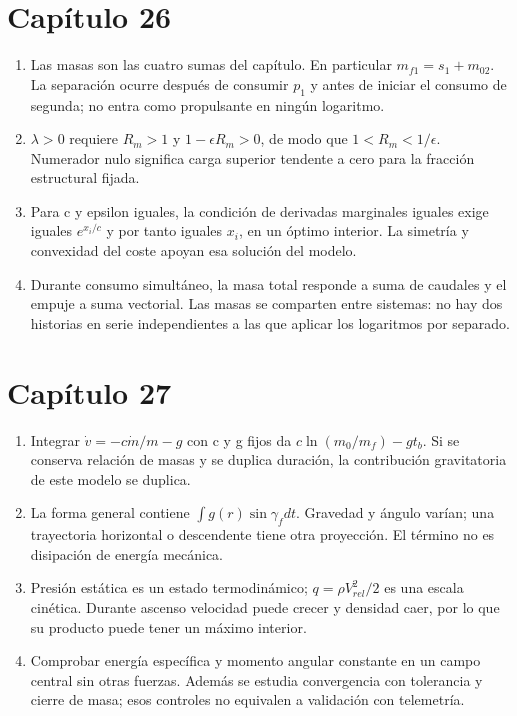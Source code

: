 \section*{Capítulo 26}
\begin{enumerate}
\item Las masas son las cuatro sumas del capítulo. En particular $m_{f1}=s_1+m_{02}$. La separación ocurre después de consumir $p_1$ y antes de iniciar el consumo de segunda; no entra como propulsante en ningún logaritmo.
\item $\lambda>0$ requiere $R_m>1$ y $1-\epsilon R_m>0$, de modo que $1<R_m<1/\epsilon$. Numerador nulo significa carga superior tendente a cero para la fracción estructural fijada.
\item Para c y epsilon iguales, la condición de derivadas marginales iguales exige iguales $e^{x_i/c}$ y por tanto iguales $x_i$, en un óptimo interior. La simetría y convexidad del coste apoyan esa solución del modelo.
\item Durante consumo simultáneo, la masa total responde a suma de caudales y el empuje a suma vectorial. Las masas se comparten entre sistemas: no hay dos historias en serie independientes a las que aplicar los logaritmos por separado.
\end{enumerate}
\section*{Capítulo 27}
\begin{enumerate}
\item Integrar $\dot v=-c\dot m/m-g$ con c y g fijos da $c\ln(m_0/m_f)-gt_b$. Si se conserva relación de masas y se duplica duración, la contribución gravitatoria de este modelo se duplica.
\item La forma general contiene $\int g(r)\sin\gamma_fdt$. Gravedad y ángulo varían; una trayectoria horizontal o descendente tiene otra proyección. El término no es disipación de energía mecánica.
\item Presión estática es un estado termodinámico; $q=\rho V_{rel}^2/2$ es una escala cinética. Durante ascenso velocidad puede crecer y densidad caer, por lo que su producto puede tener un máximo interior.
\item Comprobar energía específica y momento angular constante en un campo central sin otras fuerzas. Además se estudia convergencia con tolerancia y cierre de masa; esos controles no equivalen a validación con telemetría.
\end{enumerate}
